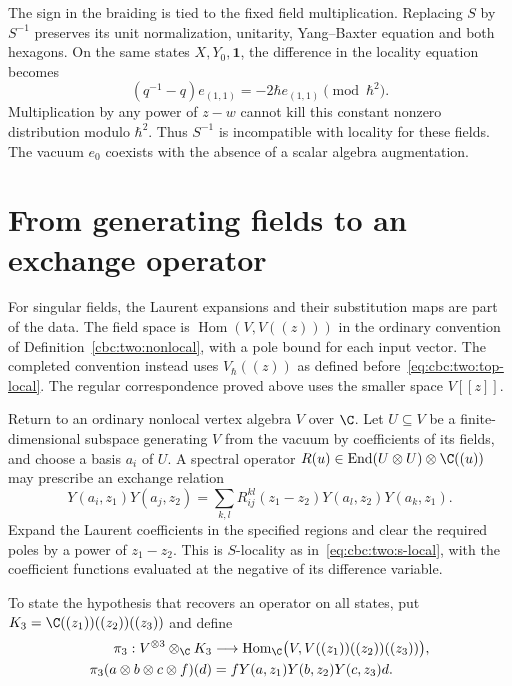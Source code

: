 The sign in the braiding is tied to the fixed field multiplication.
Replacing $S$ by $S^{-1}$ preserves its unit normalization, unitarity, Yang--Baxter equation and both hexagons.
On the same states $X,Y_0,\mathbf1$, the difference in the locality equation becomes
\[
 (q^{-1}-q)e_{(1,1)}=-2\hbar e_{(1,1)}\pmod{\hbar^2}.
\]
Multiplication by any power of $z-w$ cannot kill this constant nonzero distribution modulo $\hbar^2$.
Thus $S^{-1}$ is incompatible with locality for these fields.
The vacuum $e_0$ coexists with the absence of a scalar algebra augmentation.

\section{From generating fields to an exchange operator}
For singular fields, the Laurent expansions and their substitution maps are part of the data.
The field space is $\operatorname{Hom}(V,V((z)))$ in the ordinary convention of Definition~\ref{cbc:two:nonlocal}, with a pole bound for each input vector.
The completed convention instead uses $V_\hbar((z))$ as defined before~\eqref{eq:cbc:two:top-local}.
The regular correspondence proved above uses the smaller space $V[[z]]$.

Return to an ordinary nonlocal vertex algebra $V$ over $\C$.
Let $U\subseteq V$ be a finite-dimensional subspace generating $V$ from the vacuum by coefficients of its fields, and choose a basis $a_i$ of $U$.
A spectral operator $R(u)\in\operatorname{End}(U\otimes U)\otimes\C((u))$ may prescribe an exchange relation
\[
 Y(a_i,z_1)Y(a_j,z_2)
 =\sum_{k,l}R_{ij}^{kl}(z_1-z_2)
          Y(a_l,z_2)Y(a_k,z_1).
\]
Expand the Laurent coefficients in the specified regions and clear the required poles by a power of $z_1-z_2$.
This is $S$-locality as in~\eqref{eq:cbc:two:s-local}, with the coefficient functions evaluated at the negative of its difference variable.

To state the hypothesis that recovers an operator on all states, put
$K_3=\C((z_1))((z_2))((z_3))$ and define
\begin{align*}
 \pi_3:V^{\otimes3}\otimes_{\C}K_3
 &\longrightarrow
 \operatorname{Hom}_{\C}\bigl(V,V((z_1))((z_2))((z_3))\bigr),\\
 \pi_3(a\otimes b\otimes c\otimes f)(d)
 &=fY(a,z_1)Y(b,z_2)Y(c,z_3)d.
\end{align*}

